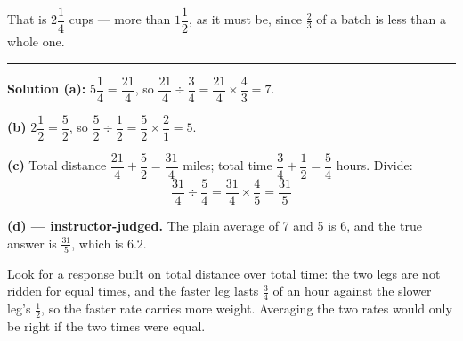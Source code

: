 \documentclass[12pt]{article}
\begin{document}
That is $2\dfrac{1}{4}$ cups --- more than $1\dfrac{1}{2}$, as it must be, since $\frac{2}{3}$ of a batch is less than a whole one.

\vspace{0.15cm}\noindent\rule{\linewidth}{0.2pt}\vspace{0.15cm}


\textbf{Solution (a):} $5\dfrac{1}{4} = \dfrac{21}{4}$, so $\dfrac{21}{4} \div \dfrac{3}{4} = \dfrac{21}{4} \times \dfrac{4}{3} = 7$. 

\textbf{(b)} $2\dfrac{1}{2} = \dfrac{5}{2}$, so $\dfrac{5}{2} \div \dfrac{1}{2} = \dfrac{5}{2} \times \dfrac{2}{1} = 5$. 

\textbf{(c)} Total distance $\dfrac{21}{4} + \dfrac{5}{2} = \dfrac{31}{4}$ miles; total time $\dfrac{3}{4} + \dfrac{1}{2} = \dfrac{5}{4}$ hours. Divide:
\[ \frac{31}{4} \div \frac{5}{4} = \frac{31}{4} \times \frac{4}{5} = \frac{31}{5} \]

\textbf{(d) --- instructor-judged.} The plain average of 7 and 5 is 6, and the true answer is $\frac{31}{5}$, which is $6.2$.

Look for a response built on total distance over total time: the two legs are not ridden for equal times, and the faster leg lasts $\frac{3}{4}$ of an hour against the slower leg's $\frac{1}{2}$, so the faster rate carries more weight. Averaging the two rates would only be right if the two times were equal.
\end{document}
